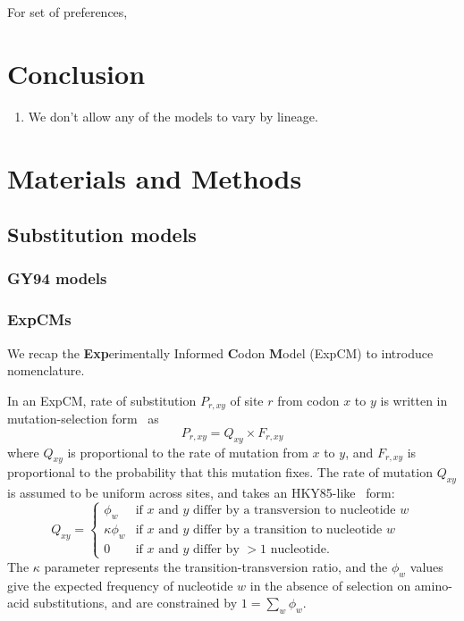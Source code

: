 \documentclass[11pt]{article}
\begin{document}
For set of preferences, 
\section*{Conclusion}

\begin{enumerate}
  \item We don't allow any of the models to vary by lineage. 
\end{enumerate}

\newpage
\section*{Materials and Methods}

\subsection*{Substitution models}
\subsubsection*{GY94 models}
\subsubsection*{ExpCMs}
We recap the \textbf{Exp}erimentally Informed \textbf{C}odon \textbf{M}odel (ExpCM) \citep{bloom2014experimentally,bloom2014informed,bloom2017identification,hilton2017phydms} to introduce nomenclature. 

In an ExpCM, rate of substitution $P_{r,xy}$ of site $r$ from codon $x$ to $y$ is written in mutation-selection form~\citep{halpern1998evolutionary,mccandlish2014modeling,spielman2015relationship} as
\begin{equation}
P_{r,xy} = Q_{xy} \times F_{r,xy}
\end{equation}
where $Q_{xy}$ is proportional to the rate of mutation from $x$ to $y$, and $F_{r,xy}$ is proportional to the probability that this mutation fixes.
The rate of mutation $Q_{xy}$ is assumed to be uniform across sites, and takes an HKY85-like~\citep{hasegawa1985dating} form:
\begin{equation}
Q_{xy} = 
\begin{cases}
\phi_w & \mbox{if $x$ and $y$ differ by a transversion to nucleotide $w$} \\
\kappa \phi_w & \mbox{if $x$ and $y$ differ by a transition to nucleotide $w$} \\
0 & \mbox{if $x$ and $y$ differ by $>1$ nucleotide.}
\end{cases}
\end{equation}
The $\kappa$ parameter represents the transition-transversion ratio, and the $\phi_w$ values give the expected frequency of nucleotide $w$ in the absence of selection on amino-acid substitutions, and are constrained by $1 = \sum_w \phi_w$.
\end{document}
